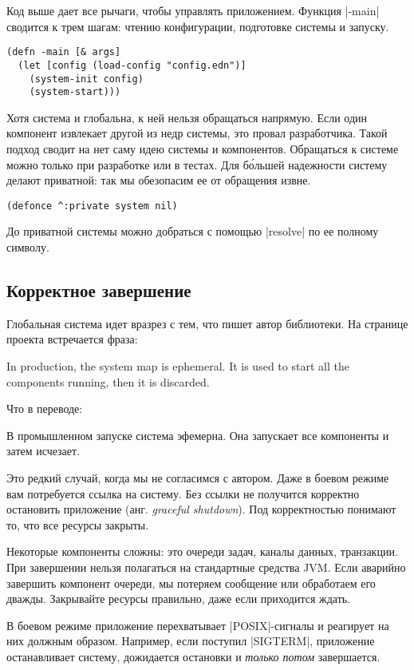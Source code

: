 Код выше дает все рычаги, чтобы управлять приложением. Функция \spverb|-main|
сводится к трем шагам: чтению конфигурации, подготовке системы и запуску.

\begin{verbatim}
(defn -main [& args]
  (let [config (load-config "config.edn")]
    (system-init config)
    (system-start)))
\end{verbatim}

Хотя система и глобальна, к ней нельзя обращаться напрямую. Если один компонент
извлекает другой из недр системы, это провал разработчика. Такой подход сводит
на нет саму идею системы и компонентов. Обращаться к системе можно только при
разработке или в тестах. Для б\'{о}льшей надежности систему делают приватной:
так мы обезопасим ее от обращения извне.

\begin{verbatim}
(defonce ^:private system nil)
\end{verbatim}

До приватной системы можно добраться с помощью \spverb|resolve| по ее полному
символу.

\subsection{Корректное завершение}

Глобальная система идет вразрез с тем, что пишет автор библиотеки. На странице
проекта встречается фраза:


In production, the system map is ephemeral. It is used to start all the
components running, then it is discarded.

Что в переводе:

В промышленном запуске система эфемерна. Она запускает все компоненты и затем
исчезает.

Это редкий случай, когда мы не согласимся с автором. Даже в боевом режиме вам
потребуется ссылка на систему. Без ссылки не получится корректно остановить
приложение (анг. \emph{graceful shutdown}). Под корректностью понимают то, что
все ресурсы закрыты.

Некоторые компоненты сложны: это очереди задач, каналы данных, транзакции. При
завершении нельзя полагаться на стандартные средства JVM. Если аварийно
завершить компонент очереди, мы потеряем сообщение или обработаем его
дважды. Закрывайте ресурсы правильно, даже если приходится ждать.

В боевом режиме приложение перехватывает \spverb|POSIX|-сигналы и реагирует на
них должным образом. Например, если поступил \spverb|SIGTERM|, приложение
останавливает систему, дожидается остановки и \emph{только потом} завершается.

